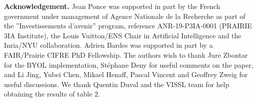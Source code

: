 \documentclass{article} %
\begin{document}


\newpage

\textbf{Acknowledgement.} Jean Ponce was supported in part by the French government under management of Agence Nationale de la Recherche as part of the ”Investissements d’avenir” program,
reference ANR-19-P3IA-0001 (PRAIRIE 3IA Institute), the Louis Vuitton/ENS Chair in Artificial
Intelligence and the Inria/NYU collaboration. Adrien Bardes was supported in part by a FAIR/Prairie
CIFRE PhD Fellowship. The authors wish to thank Jure Zbontar for the BYOL implementation,
Stéphane Deny for useful comments on the paper, and Li Jing, Yubei Chen, Mikael Henaff, Pascal
Vincent and Geoffrey Zweig for useful discussions. We thank Quentin Duval and the VISSL team for
help obtaining the results of table 2.

% 




\newpage

\end{document}
